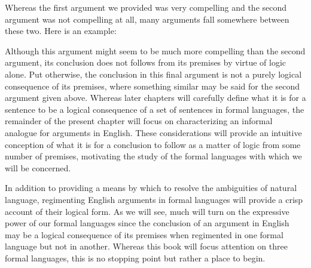 Whereas the first argument we provided was very compelling and the second argument was not compelling at all, many arguments fall somewhere between these two.
Here is an example:



\begin{earg}
\end{earg}
 
 
Although this argument might seem to be much more compelling than the second argument, its conclusion does not follows from its premises by virtue of logic alone. 
Put otherwise, the conclusion in this final argument is not a purely logical consequence of its premises, where something similar may be said for the second argument given above.
Whereas later chapters will carefully define what it is for a sentence to be a logical consequence of a set of sentences in formal languages, the remainder of the present chapter will focus on characterizing an informal analogue for arguments in English.
These considerations will provide an intuitive conception of what it is for a conclusion to follow as a matter of logic from some number of premises, motivating the study of the formal languages with which we will be concerned.

In addition to providing a means by which to resolve the ambiguities of natural language, regimenting English arguments in formal languages will provide a crisp account of their logical form.
As we will see, much will turn on the expressive power of our formal languages since the conclusion of an argument in English may be a logical consequence of its premises when regimented in one formal language but not in another.
Whereas this book will focus attention on three formal languages, this is no stopping point but rather a place to begin.






